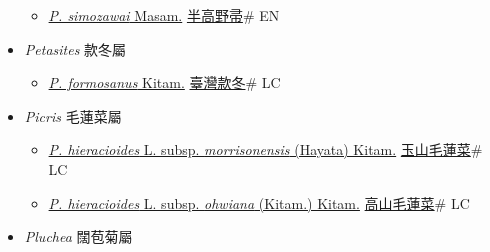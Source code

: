 \begin{itemize}
  \begin{itemize}
        \item[] \href{http://www.theplantlist.org/tpl1.1/search?q=Pertya+simozawai}{\textit{P. simozawai} Masam.}   \href{\detokenize{http://taibnet.sinica.edu.tw/chi/taibnet_species_list.php?T2=半高野帚&T2_new_value=true&fr=y}}{半高野帚}\# EN
  \end{itemize}
 \item[] \textit{Petasites} 款冬屬
                    
  \begin{itemize}
        \item[] \href{http://www.theplantlist.org/tpl1.1/search?q=Petasites+formosanus}{\textit{P. formosanus} Kitam.}   \href{\detokenize{http://taibnet.sinica.edu.tw/chi/taibnet_species_list.php?T2=臺灣款冬&T2_new_value=true&fr=y}}{臺灣款冬}\# LC
  \end{itemize}
 \item[] \textit{Picris} 毛蓮菜屬
                    
  \begin{itemize}
        \item[] \href{http://www.theplantlist.org/tpl1.1/search?q=Picris+hieracioides+subsp.+morrisonensis}{\textit{P. hieracioides} L. subsp. \textit{morrisonensis} (Hayata) Kitam.}   \href{\detokenize{http://taibnet.sinica.edu.tw/chi/taibnet_species_list.php?T2=玉山毛蓮菜&T2_new_value=true&fr=y}}{玉山毛蓮菜}\# LC
        \item[] \href{http://www.theplantlist.org/tpl1.1/search?q=Picris+hieracioides+subsp.+ohwiana}{\textit{P. hieracioides} L. subsp. \textit{ohwiana} (Kitam.) Kitam.}   \href{\detokenize{http://taibnet.sinica.edu.tw/chi/taibnet_species_list.php?T2=高山毛蓮菜&T2_new_value=true&fr=y}}{高山毛蓮菜}\# LC
  \end{itemize}
 \item[] \textit{Pluchea} 闊苞菊屬
                    

\end{itemize}
